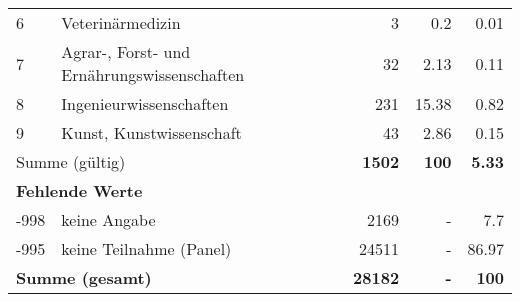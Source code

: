 \begin{longtable}{lXrrr}
     6 &
     \multicolumn{1}{X}{ Veterinärmedizin   } &


       \num{3} &
       \num[round-mode=places,round-precision=2]{0,2} &
         \num[round-mode=places,round-precision=2]{0,01} \\

     7 &
     \multicolumn{1}{X}{ Agrar-, Forst- und Ernährungswissenschaften   } &


       \num{32} &
       \num[round-mode=places,round-precision=2]{2,13} &
         \num[round-mode=places,round-precision=2]{0,11} \\

     8 &
     \multicolumn{1}{X}{ Ingenieurwissenschaften   } &


       \num{231} &
       \num[round-mode=places,round-precision=2]{15,38} &
         \num[round-mode=places,round-precision=2]{0,82} \\

     9 &
     \multicolumn{1}{X}{ Kunst, Kunstwissenschaft   } &


       \num{43} &
       \num[round-mode=places,round-precision=2]{2,86} &
         \num[round-mode=places,round-precision=2]{0,15} \\
     \midrule
     \multicolumn{2}{l}{Summe (gültig)} &
       \textbf{\num{1502}} &
     \textbf{100} &
       \textbf{\num[round-mode=places,round-precision=2]{5,33}} \\
     \multicolumn{5}{l}{\textbf{Fehlende Werte}}\\
       -998 &
       keine Angabe &
         \num{2169} &
        - &
         \num[round-mode=places,round-precision=2]{7,7} \\
       -995 &
       keine Teilnahme (Panel) &
         \num{24511} &
        - &
         \num[round-mode=places,round-precision=2]{86,97} \\
     \midrule
     \multicolumn{2}{l}{\textbf{Summe (gesamt)}} &
          \textbf{\num{28182}} &
        \textbf{-} &
        \textbf{100} \\
     \bottomrule
     \end{longtable}
     
